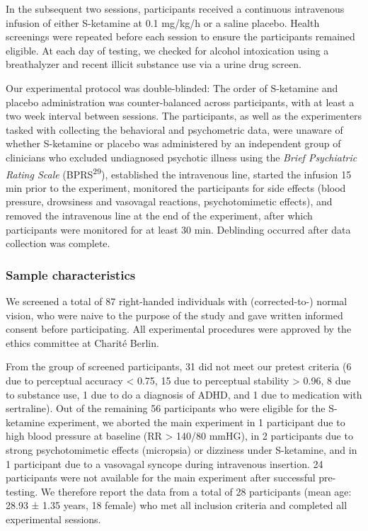 \documentclass[
]{article}
\begin{document}
In the subsequent two sessions, participants received a continuous
intravenous infusion of either S-ketamine at 0.1 mg/kg/h or a saline
placebo. Health screenings were repeated before each session to ensure
the participants remained eligible. At each day of testing, we checked
for alcohol intoxication using a breathalyzer and recent illicit
substance use via a urine drug screen.

Our experimental protocol was double-blinded: The order of S-ketamine
and placebo administration was counter-balanced across participants,
with at least a two week interval between sessions. The participants, as
well as the experimenters tasked with collecting the behavioral and
psychometric data, were unaware of whether S-ketamine or placebo was
administered by an independent group of clinicians who excluded
undiagnosed psychotic illness using the \emph{Brief Psychiatric Rating
Scale} (BPRS\textsuperscript{29}), established the intravenous line,
started the infusion 15 min prior to the experiment, monitored the
participants for side effects (blood pressure, drowsiness and vasovagal
reactions, psychotomimetic effects), and removed the intravenous line at
the end of the experiment, after which participants were monitored for
at least 30 min. Deblinding occurred after data collection was complete.

\hypertarget{sample-characteristics}{%
\subsubsection{Sample characteristics}\label{sample-characteristics}}

We screened a total of 87 right-handed individuals with (corrected-to-)
normal vision, who were naive to the purpose of the study and gave
written informed consent before participating. All experimental
procedures were approved by the ethics committee at Charité Berlin.

From the group of screened participants, 31 did not meet our pretest
criteria (6 due to perceptual accuracy \textless{} 0.75, 15 due to
perceptual stability \textgreater{} 0.96, 8 due to substance use, 1 due
to do a diagnosis of ADHD, and 1 due to medication with sertraline). Out
of the remaining 56 participants who were eligible for the S-ketamine
experiment, we aborted the main experiment in 1 participant due to high
blood pressure at baseline (RR \textgreater{} 140/80 mmHG), in 2
participants due to strong psychotomimetic effects (micropsia) or
dizziness under S-ketamine, and in 1 participant due to a vasovagal
syncope during intravenous insertion. 24 participants were not available
for the main experiment after successful pre-testing. We therefore
report the data from a total of 28 participants (mean age: 28.93 ± 1.35
years, 18 female) who met all inclusion criteria and completed all
experimental sessions.
\end{document}

